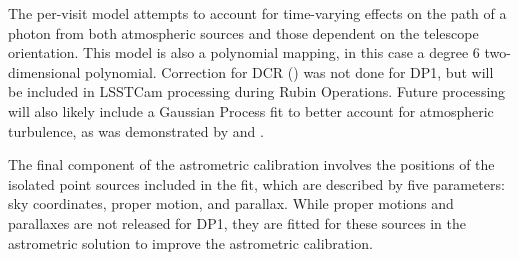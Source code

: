 The per-visit model attempts to account for time-varying effects on the path of a photon from both atmospheric sources and those dependent on the telescope orientation.
This model is also a polynomial mapping, in this case a degree 6 two-dimensional polynomial.
Correction for \gls{DCR} () was not done for \gls{DP1}, but will be included in LSSTCam processing during \gls{Rubin Operations}.
Future processing will also likely include a Gaussian Process fit to better account for atmospheric turbulence, as was demonstrated by \citet{Fortino2021} and \citet{Leget2021}.

The final component of the astrometric \gls{calibration} involves the positions of the isolated point sources included in the fit, which are described by five parameters: sky coordinates, proper motion, and parallax.
While proper motions and parallaxes are not released for DP1, they are fitted for these sources in the astrometric solution to improve the astrometric calibration.

